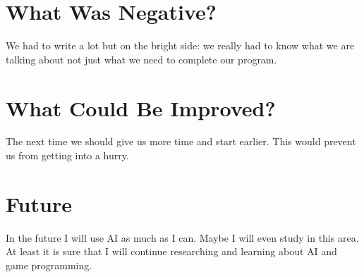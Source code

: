 \section*{What Was Negative?}
We had to write a lot but on the bright side: we really had to know what we are talking about not just what we need to complete our program.

\section*{What Could Be Improved?}
The next time we should give us more time and start earlier. This would prevent us from getting into a hurry.

\section*{Future}
In the future I will use AI as much as I can. Maybe I will even study in this area. At least it is sure that I will continue researching and learning about AI and game programming.



